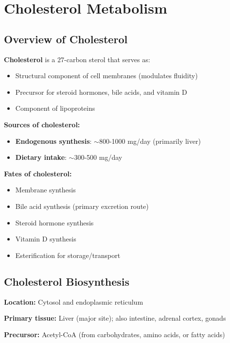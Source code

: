 \section{Cholesterol Metabolism}

\subsection{Overview of Cholesterol}

\begin{definition}
\textbf{Cholesterol} is a 27-carbon sterol that serves as:
\begin{itemize}
    \item Structural component of cell membranes (modulates fluidity)
    \item Precursor for steroid hormones, bile acids, and vitamin D
    \item Component of lipoproteins
\end{itemize}
\end{definition}

\textbf{Sources of cholesterol:}
\begin{itemize}
    \item \textbf{Endogenous synthesis}: $\sim$800-1000 mg/day (primarily liver)
    \item \textbf{Dietary intake}: $\sim$300-500 mg/day
\end{itemize}

\textbf{Fates of cholesterol:}
\begin{itemize}
    \item Membrane synthesis
    \item Bile acid synthesis (primary excretion route)
    \item Steroid hormone synthesis
    \item Vitamin D synthesis
    \item Esterification for storage/transport
\end{itemize}

\subsection{Cholesterol Biosynthesis}

\textbf{Location:} Cytosol and endoplasmic reticulum

\textbf{Primary tissue:} Liver (major site); also intestine, adrenal cortex, gonads

\textbf{Precursor:} Acetyl-CoA (from carbohydrates, amino acids, or fatty acids)

